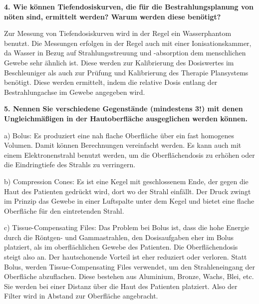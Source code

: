 \textbf{4. Wie können Tiefendosiskurven, die für die Bestrahlungsplanung von nöten sind, ermittelt werden? Warum werden diese benötigt?}

Zur Messung von Tiefendosiskurven wird in der Regel ein Wasserphantom benutzt. Die Messungen erfolgen in der Regel auch mit einer Ionisationskammer, da Wasser in Bezug auf Strahlungsstreuung und -absorption dem menschlichen Gewebe sehr ähnlich ist. Diese werden zur Kalibrierung des Dosiswertes im Beschleuniger als auch zur Prüfung und Kalibrierung des Therapie Plansystems benötigt. Diese werden ermittelt, indem die relative Dosis entlang der Bestrahlungachse im Gewebe angegeben wird.

\textbf{5. Nennen Sie verschiedene Gegenstände (mindestens 3!) mit denen Ungleichmäßigen in der Hautoberfläche ausgeglichen werden können.}

a) Bolus: Es produziert eine nah flache Oberfläche über ein fast homogenes Volumen. Damit können Berechnungen vereinfacht werden. Es kann auch mit einem Elektronenstrahl benutzt werden, um die Oberflächendosis zu erhöhen oder die Eindringtiefe des Strahls zu verringern.

b) Compression Cones: Es ist eine Kegel mit geschlossenem Ende, der gegen die Haut des Patienten gedrückt wird, dort wo der Strahl einfällt. Der Druck zwingt im Prinzip das Gewebe in einer Luftspalte unter dem Kegel und bietet eine flache Oberfläche für den eintretenden Strahl.

c) Tissue-Compensating Files: Das Problem bei Bolus ist, dass die hohe Energie durch die Röntgen- und Gammastrahlen, den Dosisaufgaben eher im Bolus platziert, als im oberflächlichen Gewebe des Patienten. Die Oberflächendosis steigt also an. Der hautschonende Vorteil ist eher reduziert oder verloren. Statt Bolus, werden Tissue-Compensating Files verwendet, um den Strahleneingang der Oberfläche abzuflachen. Diese bestehen aus Aluminium, Bronze, Wachs, Blei, etc. Sie werden bei einer Distanz über die Haut des Patienten platziert. Also der Filter wird in Abstand zur Oberfläche angebracht.



 


